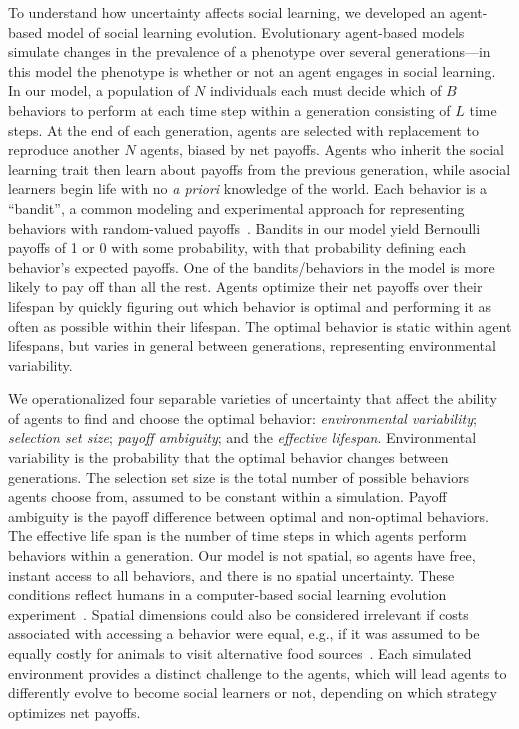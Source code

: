\documentclass[letterpaper,11.5pt]{scrartcl}
\begin{document}
To understand how uncertainty affects social learning, 
we developed an agent-based model of
social learning evolution.  Evolutionary agent-based models simulate changes in
the prevalence of a phenotype over several generations---in this model the phenotype
is whether or not an agent engages in social learning.  In our model, a
population of $N$ individuals each must decide which of $B$ behaviors to perform at
each time step within a generation consisting of $L$ time steps. At the end of each
generation, agents are selected with replacement to reproduce another $N$ agents, 
biased by net payoffs. Agents
who inherit the social learning trait then learn about payoffs from the
previous generation, while asocial learners begin life with no \emph{a priori}
knowledge of the world.  Each behavior is a ``bandit'', a common modeling and
experimental approach for representing behaviors with random-valued
payoffs~\cite{SuttonBartoBook,McElreath2005,Steyvers2009,Rendell2010,Schulz2019}.
Bandits in our model yield Bernoulli payoffs of 1 or 0 with some probability,
with that probability defining each behavior's expected payoffs.  One of the
bandits/behaviors in the model is more likely to pay off than all the rest.  Agents
optimize their net payoffs over their lifespan by quickly figuring out which
behavior is optimal and performing it as often as possible within their lifespan.
The optimal behavior is static within agent lifespans, but varies in general between
generations, representing environmental variability.

We operationalized four separable varieties of uncertainty that affect the
ability of agents to find and choose the optimal behavior: 
\emph{environmental variability}; 
\emph{selection set size}; \emph{payoff ambiguity}; and the \emph{effective lifespan}. 
Environmental variability is the probability that the optimal behavior changes
between generations.   
The selection set size is the total number of possible
behaviors agents choose from, assumed to be constant within a simulation.  
Payoff ambiguity is the payoff difference between optimal
and non-optimal behaviors. The effective life span is the
number of time steps in which agents perform behaviors within a generation. 
Our model is not spatial, so agents have free, instant
access to all behaviors, and there is no spatial uncertainty. 
These conditions reflect humans in a computer-based social learning evolution
experiment~\cite{McElreath2005,Morgan2012,Derex2016}. Spatial dimensions could also be
considered irrelevant if costs associated with accessing a behavior were equal,
e.g., if it was assumed to be equally costly for animals to
visit alternative food sources~\cite{Aplin2017,Baracchi2018}.
Each simulated environment provides a distinct challenge
to the agents, which will lead agents to differently evolve to become social
learners or not, depending on which strategy optimizes net payoffs.
\end{document}
